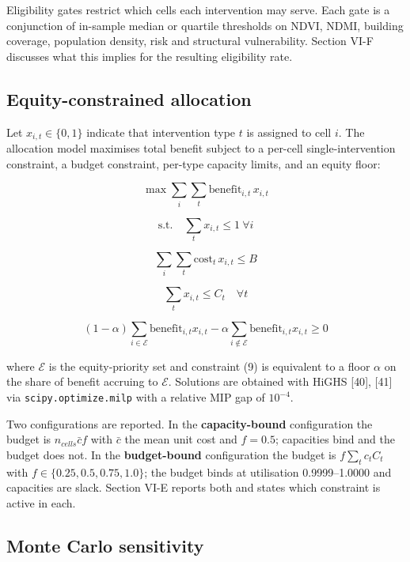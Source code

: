 Eligibility gates restrict which cells each intervention may serve. Each gate is a conjunction of
in-sample median or quartile thresholds on NDVI, NDMI, building coverage, population density, risk
and structural vulnerability. Section VI-F discusses what this implies for the resulting eligibility
rate.

\subsection{Equity-constrained allocation}\label{h.-equity-constrained-allocation}

Let \(x_{i,t} \in \{0,1\}\) indicate that intervention type \(t\) is assigned to cell \(i\). The
allocation model maximises total benefit subject to a per-cell single-intervention constraint, a
budget constraint, per-type capacity limits, and an equity floor:

\[\max \sum_i \sum_t \mathrm{benefit}_{i,t} \, x_{i,t} \tag{5}\]

\[\text{s.t.}\quad \sum_t x_{i,t} \leq 1 \ \forall i \tag{6}\]

\[\sum_i \sum_t \mathrm{cost}_t \, x_{i,t} \leq B \tag{7}\]

\[\sum_t x_{i,t} \leq C_t \quad \forall t \tag{8}\]

\[(1 - \alpha) \sum_{i \in \mathcal{E}} \mathrm{benefit}_{i,t} x_{i,t} - \alpha \sum_{i \notin \mathcal{E}} \mathrm{benefit}_{i,t} x_{i,t} \geq 0 \tag{9}\]

where \(\mathcal{E}\) is the equity-priority set and constraint (9) is equivalent to a floor \(\alpha\) on
the share of benefit accruing to \(\mathcal{E}\). Solutions are obtained with HiGHS {[}40{]}, {[}41{]} via
\texttt{scipy.optimize.milp} with a relative MIP gap of \(10^{-4}\).

Two configurations are reported. In the \textbf{capacity-bound} configuration the budget is
\(n_{cells} \bar{c} f\) with \(\bar{c}\) the mean unit cost and \(f = 0.5\); capacities bind and the budget
does not. In the \textbf{budget-bound} configuration the budget is \(f \sum_t c_t C_t\) with
\(f \in \{0.25, 0.5, 0.75, 1.0\}\); the budget binds at utilisation 0.9999--1.0000 and capacities are
slack. Section VI-E reports both and states which constraint is active in each.

\subsection{Monte Carlo sensitivity}\label{i.-monte-carlo-sensitivity}


